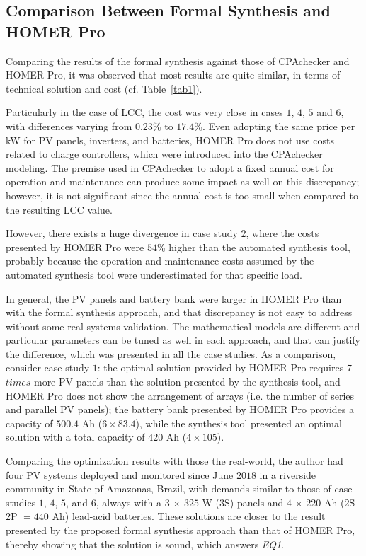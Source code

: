 \subsection{Comparison Between Formal Synthesis and HOMER Pro}

Comparing the results of the formal synthesis against those of CPAchecker and HOMER Pro, it was observed that most results are quite similar, 
in terms of technical solution and cost (cf. Table~\ref{tab1}). 

Particularly in the case of LCC, the cost was very close in cases $1$, $4$, $5$ and $6$, with differences varying from $0.23$\% to $17.4$\%. Even adopting the same price per kW for PV panels, inverters, and batteries, HOMER Pro does not use costs related to charge controllers, which were introduced into the CPAchecker modeling. The premise used in CPAchecker to adopt a fixed annual cost for operation and maintenance can produce some impact as well on this discrepancy; however, it is not significant since the annual cost is too small when compared to the resulting LCC value.

However, there exists a huge divergence in case study $2$, where the costs presented by HOMER Pro were $54$\% higher than the automated synthesis tool, probably because the operation and maintenance costs assumed by the automated synthesis tool were underestimated for that specific load. 

In general, the PV panels and battery bank were larger in HOMER Pro than with the formal synthesis approach, and that discrepancy is not easy to address without some real systems validation. The mathematical models are different and particular parameters can be tuned as well in each approach, and that can justify the difference, which was presented in all the case studies. As a comparison, consider case study $1$: the optimal solution provided by HOMER Pro requires $7$ $times$ more PV panels than the solution presented by the synthesis tool, and HOMER Pro does not show the arrangement of arrays (i.e. the number of series and parallel PV panels); the battery bank presented by HOMER Pro provides a capacity of $500.4$ Ah ($6 \times 83.4$), while the synthesis tool presented an optimal solution with a total capacity of $420$ Ah ($4 \times 105$). 

Comparing the optimization results with those the real-world, the author had four PV systems deployed and monitored since June $2018$ in a riverside community in State pf Amazonas, Brazil, with demands  similar to those of case studies $1$, $4$, $5$, and $6$, always with a $3$ $\times$ $325$ W ($3$S) panels and $4$ $\times$ $220$ Ah ($2$S-$2$P $= 440$ Ah) lead-acid batteries. These solutions are closer to the result presented by the proposed formal synthesis approach than that of HOMER Pro, thereby showing that the solution is sound, which answers \textit{EQ1}.

